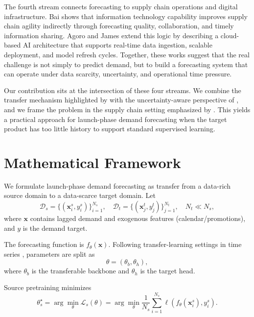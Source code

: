 \documentclass[3p,times,procedia]{elsarticle}
\begin{document}
The fourth stream connects forecasting to supply chain operations and digital infrastructure. Bai \cite{Bai2022} shows that information technology capability improves supply chain agility indirectly through forecasting quality, collaboration, and timely information sharing. Agoro and James \cite{Agoro2023} extend this logic by describing a cloud-based AI architecture that supports real-time data ingestion, scalable deployment, and model refresh cycles. Together, these works suggest that the real challenge is not simply to predict demand, but to build a forecasting system that can operate under data scarcity, uncertainty, and operational time pressure.

Our contribution sits at the intersection of these four streams. We combine the transfer mechanism highlighted by \cite{Weber2021,Fawaz2018} with the uncertainty-aware perspective of \cite{Xu2019,Jiang2019}, and we frame the problem in the supply chain setting emphasized by \cite{Seyedan2020,Bai2022,Agoro2023}. This yields a practical approach for launch-phase demand forecasting when the target product has too little history to support standard supervised learning.

\section{Mathematical Framework}
We formulate launch-phase demand forecasting as transfer from a data-rich source domain to a data-scarce target domain. Let
\begin{equation}
\mathcal{D}_s = \{(\mathbf{x}_i^s, y_i^s)\}_{i=1}^{N_s},
\quad
\mathcal{D}_t = \{(\mathbf{x}_j^t, y_j^t)\}_{j=1}^{N_t},
\quad N_t \ll N_s,
\end{equation}
where $\mathbf{x}$ contains lagged demand and exogenous features (calendar/promotions), and $y$ is the demand target.

The forecasting function is $f_{\theta}(\mathbf{x})$. Following transfer-learning settings in time series \cite{Weber2021,Fawaz2018}, parameters are split as
\begin{equation}
\theta = (\theta_b, \theta_h),
\end{equation}
where $\theta_b$ is the transferable backbone and $\theta_h$ is the target head.

Source pretraining minimizes
\begin{equation}
\theta_s^{\star} = \arg\min_{\theta} \mathcal{L}_s(\theta)
= \arg\min_{\theta} \frac{1}{N_s}\sum_{i=1}^{N_s}
\ell\left(f_{\theta}(\mathbf{x}_i^s), y_i^s\right).
\end{equation}
\end{document}
